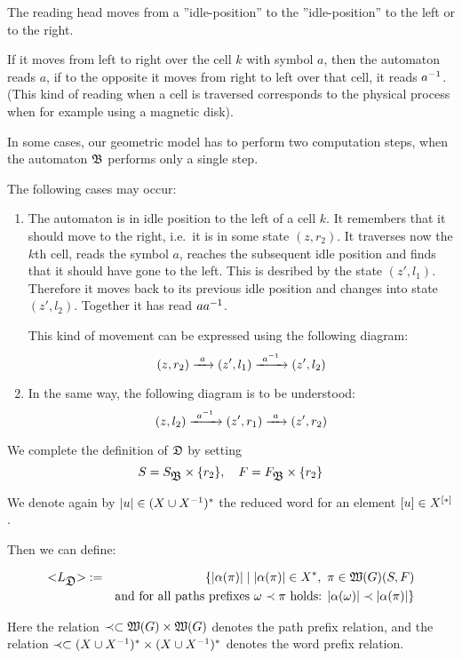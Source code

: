 The reading head moves from a ''idle-position'' to the ''idle-position'' to the
left or to the right.

If it moves from left to right over the cell $k$ with symbol $a$, then the
automaton reads $a$, if to the opposite it moves from right to left over that
cell, it reads ${{a}^{-1}}$. (This kind of reading when a cell is traversed
corresponds to the physical process when for example using a magnetic disk).

In some cases, our geometric model has to perform two computation steps, when
the automaton $\mbox{$\mathfrak{B}$}$ performs only a single step.

The following cases may occur:

\begin{enumerate}
  \item The automaton is in idle position to the left of a cell $k$. It
  remembers that it should move to the right, i.e.\ it is in some state $(z,
  r_2)$. It traverses now the $k$th cell, reads the symbol $a$, reaches the
  subsequent idle position and finds that it should have gone to the left. This
  is desribed by the state $(z', l_1)$. Therefore it moves back to its previous
  idle position and changes into state $(z', l_2)$. Together it has read $a
  {{a}^{-1}}$.
  
  This kind of movement can be expressed using the following diagram:
  \[ (z, r_2) \xrightarrow{\ {a}\ } (z', l_1) \xrightarrow{\ {{{a}^{-1}}}\ } (z', l_2) \]
  
  \item In the same way, the following diagram is to be understood:
  \[ (z, l_2) \xrightarrow{\ {{{a}^{-1}}}\ } (z', r_1) \xrightarrow{\ {a}\ } (z', r_2) \]
\end{enumerate}

We complete the definition of $\mbox{$\mathfrak{D}$}$ by setting
\[ S = S_{\mbox{$\mathfrak{B}$}} \times \mbox{$\{r_2\}$},\quad F = F_{\mbox{$\mathfrak{B}$}} \times \mbox{$\{r_2\}$} \]

We denote again by $|u| \in (X \cup {X}^{-1})^*$ the reduced word for an element
$[u] \in \mbox{${X}^{[*]}$}$.

Then we can define:

\begin{definition}
\begin{eqnarray*}
\mbox{${<}{L_{\mbox{$\mathfrak{D}$}}}{>}$} &:=& \{ |\alpha(\pi)| \mid  |\alpha(\pi)| \in
X^*,\ \pi \in \mbox{$\mathfrak{W}({G})$}(S, F) \\
&& \text{and for all paths prefixes }\omega \prec \pi \text{ holds: }
|\alpha(\omega)| \prec |\alpha(\pi)| \}
\end{eqnarray*}

Here the relation $\prec \subset \mbox{$\mathfrak{W}({G})$} \times \mbox{$\mathfrak{W}({G})$}$ denotes the
path prefix relation, and the relation $\prec \subset (X \cup {X}^{-1})^* \times
(X \cup {X}^{-1})^*$ denotes the word prefix relation.
\end{definition}

